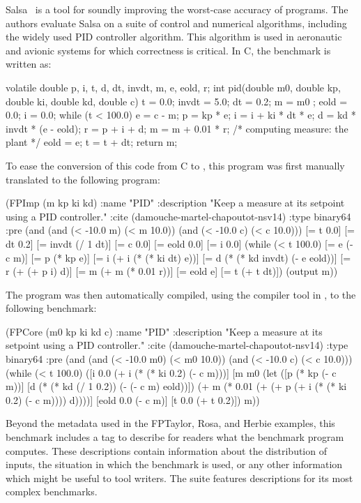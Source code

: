 \documentclass[main.tex]{subfiles}
\begin{document}
Salsa~\cite{fmics15} is a tool for soundly improving the worst-case
accuracy of programs.  The authors evaluate Salsa on a suite of control and
numerical algorithms, including the widely used PID controller algorithm.
This algorithm is used in aeronautic and avionic systems for which
correctness is critical. In C, the benchmark is written as:

\begin{code}
volatile double p, i, t, d, dt, invdt, m, e, eold, r; 
int pid(double m0, double kp, double ki, double kd, double c){
  t     = 0.0;
  invdt = 5.0;
  dt    = 0.2;
  m     = m0 ;
  eold  = 0.0;
  i     = 0.0;
  while (t < 100.0) {
       e = c - m;
       p = kp * e;
       i = i + ki * dt * e;
       d = kd * invdt * (e - eold);
       r = p + i + d;
       m = m + 0.01 * r; /* computing measure: the plant */
       eold = e;
       t = t + dt;
  }
  return m;
}
\end{code}

To ease the conversion of this code from C to \core,
  this program was first manually translated
  to the following \surface program:

\begin{code}
(FPImp (m kp ki kd)
 :name "PID"
 :description "Keep a measure at its setpoint using a PID controller."
 :cite (damouche-martel-chapoutot-nsv14)
 :type binary64
 :pre (and (and (< -10.0 m) (< m 10.0)) (and (< -10.0 c) (< c 10.0)))
 [= t 0.0]
 [= dt 0.2]
 [= invdt (/ 1 dt)]
 [= c 0.0]
 [= eold 0.0]
 [= i 0.0]
 (while (< t 100.0)
   [= e (- c m)]
   [= p (* kp e)]
   [= i (+ i (* (* ki dt) e))]
   [= d (* (* kd invdt) (- e eold))]
   [= r (+ (+ p i) d)]
   [= m (+ m (* 0.01 r))]
   [= eold e]
   [= t (+ t dt)])
 (output m))
\end{code}

The \surface program was then automatically compiled,
  using the compiler tool in \name,
  to the following \core benchmark:

\begin{code}
(FPCore (m0 kp ki kd c)
  :name "PID"
  :description "Keep a measure at its setpoint using a PID controller."
  :cite (damouche-martel-chapoutot-nsv14)
  :type binary64
  :pre (and (and (< -10.0 m0) (< m0 10.0)) (and (< -10.0 c) (< c 10.0)))
  (while (< t 100.0)
   ([i 0.0 (+ i (* (* ki 0.2) (- c m)))]
    [m m0
     (let ([p (* kp (- c m))]
           [d (* (* kd (/ 1 0.2)) (- (- c m) eold))])
     (+ m (* 0.01 (+ (+ p (+ i (* (* ki 0.2) (- c m)))) d))))]
    [eold 0.0 (- c m)]
    [t 0.0 (+ t 0.2)])
   m))
\end{code}

Beyond the metadata used in the FPTaylor, Rosa, and Herbie examples,
  this benchmark includes a  tag
  to describe for readers what the benchmark program computes.
These descriptions contain information about the distribution of inputs,
  the situation in which the benchmark is used,
  or any other information which might be useful to tool writers.
The \name suite features descriptions for its most complex benchmarks. 
\end{document}
